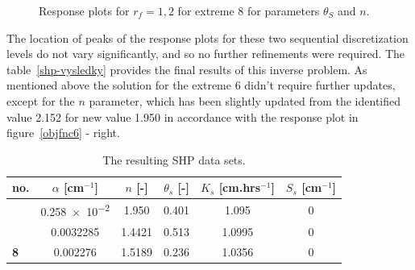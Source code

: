 \documentclass[review,times,3p,twocolumn,10pt]{elsarticle}
\newcommand{\fs}{\footnotesize}
\begin{document}
\begin{figure}[htb!]
\label{ext6rf1-an2-example}
\caption{Response plots for $r_f=1,2$ for extreme 8 for parameters $\theta_S$ and $n$.}
\end{figure}


The location of peaks of the response plots for these two sequential discretization levels do not vary significantly, and so no further refinements were required. The table~\ref{shp-vysledky} provides the final results of this inverse problem. As mentioned above the solution for the extreme 6 didn't require further updates, except for  the $n$ parameter, which has been slightly updated from the identified value 2.152 for new value 1.950 in accordance with the response plot in figure~\ref{objfnc6} - right.

\begin{table}[ht]
\centering
\caption{The resulting SHP data sets.}
\fs
\begin{tabular}{l || c c c c c }
\toprule
no. & $\alpha$ [cm$^{-1}$] & $n$ [-] & $\theta_s$ [-] & $K_s$ [cm.hrs$^{-1}$] & $S_s$  [cm$^{-1}$]\\ \hline \hline
\rowcolor{white}{\bf 6} & \num{0.258e-2} & \num{1.950}  & 0.401 &  \num{1.095} & 0  \\ 
\rowcolor{white}{\bf 7} & \num{0.0032285} & \num{1.4421} & 0.513 &  \num{1.0995} & 0  \\ 
\rowcolor{white} {\bf 8} & \num{0.002276} & \num{1.5189} & 0.236 &  \num{1.0356} &  \num{0}\\ \hline
\toprule
\end{tabular}
\label{shp-vysledky-final}
\end{table}
\end{document}
